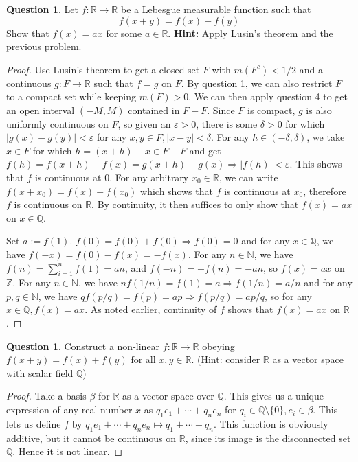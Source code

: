\documentclass{article}
\renewcommand{\implies}{\Rightarrow}
\newcommand{\N}{\mathbb{N}}
\newcommand{\Z}{\mathbb{Z}}
\newcommand{\Q}{\mathbb{Q}}
\newcommand{\R}{\mathbb{R}}
\theoremstyle{definition} %
\numberwithin{thm}{section} %
\theoremstyle{definition} %
\newtheorem{question}[thm]{Question}
\begin{document}
\begin{question}
Let $f : \mathbb{R} \to \mathbb{R}$ be a Lebesgue measurable function such that
\[ f(x+y) = f(x) + f(y) \]
Show that $f(x) = ax$ for some $a \in \mathbb{R}$. \textbf{Hint:} Apply Lusin's theorem and the previous problem.
\end{question}
\begin{proof}
Use Lusin's theorem to get a closed set $F$ with $m(F^c) < 1/2$ and a continuous $g: F \to \R$ such that $f = g$ on $F$. By question 1, we can also restrict $F$ to a compact set while keeping $m(F) > 0$. We can then apply question 4 to get an open interval $(-M, M)$ contained in $F - F$. Since $F$ is compact, $g$ is also uniformly continuous on $F$, so given an $\varepsilon > 0$, there is some $\delta > 0$ for which $|g(x) - g(y)| < \varepsilon$ for any $x, y \in F, |x - y| < \delta$. For any $h \in (-\delta, \delta)$, we take $x \in F$ for which $h = (x + h) - x \in F - F$ and get $f(h) = f(x + h) - f(x) = g(x + h) - g(x) \implies |f(h)| < \varepsilon$. This shows that $f$ is continuous at 0. For any arbitrary $x_0 \in \R$, we can write $f(x + x_0) = f(x) + f(x_0)$ which shows that $f$ is continuous at $x_0$, therefore $f$ is continuous on $\R$. By continuity, it then suffices to only show that $f(x) = ax$ on $x \in \Q$.

Set $a := f(1)$. $f(0) = f(0) + f(0) \implies f(0) = 0$ and for any $x \in \Q$, we have $f(-x) = f(0) - f(x) = -f(x)$. For any $n \in \N$, we have $f(n) = \sum_{i = 1}^n f(1) = an$, and $f(-n) = -f(n) = -an$, so $f(x) = ax$ on $\Z$. For any $n \in \N$, we have $nf(1/n) = f(1) = a \implies f(1/n) = a/n$ and for any $p, q \in \N$, we have $qf(p/q) = f(p) = ap \implies f(p/q) = ap/q$, so for any $x \in \Q, f(x) = ax$. As noted earlier, continuity of $f$ shows that $f(x) = ax$ on $\R$.
\end{proof}

\begin{question}
Construct a non-linear $f : \mathbb{R} \to \mathbb{R}$ obeying $f(x+y) = f(x) + f(y)$ for all $x, y \in \mathbb{R}$. (Hint: consider $\mathbb{R}$ as a vector space with scalar field $\mathbb{Q}$)
\end{question}
\begin{proof}
Take a basis $\beta$ for $\R$ as a vector space over $\Q$. This gives us a unique expression of any real number $x$ as $q_1e_1 + \cdots + q_ne_n$ for $q_i \in \Q \setminus \{0\}, e_i \in \beta$. This lets us define $f$ by $q_1e_1 + \cdots + q_ne_n \mapsto q_1 + \cdots + q_n$. This function is obviously additive, but it cannot be continuous on $\R$, since its image is the disconnected set $\Q$. Hence it is not linear.
\end{proof}
\end{document}
